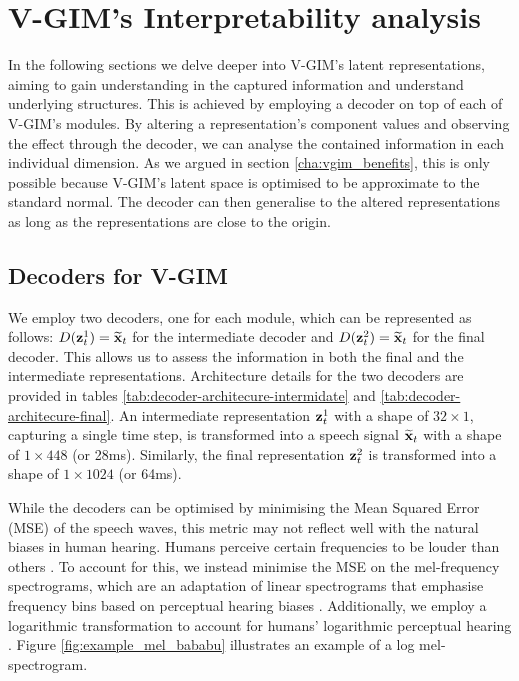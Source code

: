 \section{V-GIM's Interpretability analysis}
	In the following sections we delve deeper into V-GIM's latent representations, aiming to gain understanding in the captured information and understand underlying structures. This is achieved by employing a decoder on top of each of V-GIM's modules. By altering a representation's component values and observing the effect through the decoder, we can analyse the contained information in each individual dimension. As we argued in section \ref{cha:vgim_benefits}, this is only possible because V-GIM's latent space is optimised to be approximate to the standard normal. The decoder can then generalise to the altered representations as long as the representations are close to the origin.
	
	\subsection{Decoders for V-GIM}
		We employ two decoders, one for each module, which can be represented as follows: $D(\mathbf{z}_t^1) = \widetilde{\mathbf{x}}_t$ for the intermediate decoder and $D(\mathbf{z}_t^2) = \widetilde{\mathbf{x}}_t$ for the final decoder. This allows us to assess the information in both the final and the intermediate representations. Architecture details for the two decoders are provided in tables \ref{tab:decoder-architecure-intermidate} and \ref{tab:decoder-architecure-final}. 
		An intermediate representation $\mathbf{z}_t^1$ with a shape of $32 \times 1$, capturing a single time step, is transformed into a speech signal $\widetilde{\mathbf{x}}_t$ with a shape of $1 \times 448$ (or 28ms). Similarly,  the final representation $\mathbf{z}_t^2$ is transformed into a shape of $1 \times 1024$ (or 64ms).
			
		
			
		While the decoders can be optimised by minimising the Mean Squared Error (MSE) of the speech waves, this metric may not reflect well with the natural biases in human hearing. Humans perceive certain frequencies to be louder than others \cite{radkoffLossFunctionsAudio2021, liSupervisedSpeechEnhancement2020}. To account for this, we instead minimise the MSE on the mel-frequency spectrograms, which are an adaptation of linear spectrograms that emphasise frequency bins based on perceptual hearing biases \cite{shenNaturalTTSSynthesis2018}. Additionally, we employ a logarithmic transformation to account for humans' logarithmic perceptual hearing \cite{braunConsolidatedViewLoss2020}. Figure \ref{fig:example_mel_bababu} illustrates an example of a log mel-spectrogram. 
		
